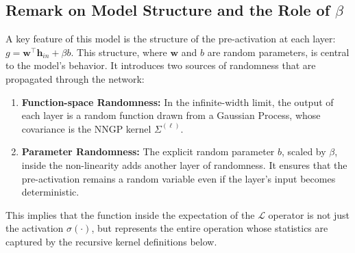 \documentclass[a4paper]{article}
\begin{document}
\subsection{Remark on Model Structure and the Role of \(\beta\)}
A key feature of this model is the structure of the pre-activation at each layer: $g = \bm{w}^\top \bm{h}_{in} + \beta b$. This structure, where $\bm{w}$ and $b$ are random parameters, is central to the model's behavior. It introduces two sources of randomness that are propagated through the network:
\begin{enumerate}
    \item \textbf{Function-space Randomness:} In the infinite-width limit, the output of each layer is a random function drawn from a Gaussian Process, whose covariance is the NNGP kernel $\Sigma^{(\ell)}$.
    \item \textbf{Parameter Randomness:} The explicit random parameter $b$, scaled by $\beta$, inside the non-linearity adds another layer of randomness. It ensures that the pre-activation remains a random variable even if the layer's input becomes deterministic. 
\end{enumerate}
This implies that the function inside the expectation of the $\mathcal{L}$ operator is not just the activation $\sigma(\cdot)$, but represents the entire operation whose statistics are captured by the recursive kernel definitions below.
\end{document}
